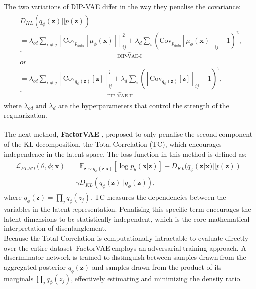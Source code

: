 The two variations of DIP-VAE differ in the way they penalise the covariance:
\begin{align}
\begin{split}
    & D_{KL}(q_{\phi}(\mathbf{z})||p(\mathbf{z})) = \\
    &\underbrace{ = \lambda_{od} \sum_{i\neq j} [\text{Cov}_{p_{data}}[\mu_{\phi}(\mathbf{x})]]^2_{ij} + \lambda_d \sum_i \left(\text{Cov}_{p_{data}}[\mu_{\phi}(\mathbf{x})]_{ij} - 1\right)^2}_{\text{DIP-VAE-I}}, \\
    & or \\
    &\underbrace{= \lambda_{od} \sum_{i\neq j} [\text{Cov}_{q_{\phi}(\mathbf{z})}[\mathbf{z}]]^2_{ij} + \lambda_d \sum_i \left([\text{Cov}_{q_{\phi}(\mathbf{z})}[\mathbf{z}]]_{ij} - 1\right)^2}_{\text{DIP-VAE-II}},
\end{split}
\end{align}
where $\lambda_{od}$ and $\lambda_d$ are the hyperparameters that control the strength of the regularization. \\
\\
The next method, \textbf{FactorVAE} \cite{kim2019disentanglingfactorising}, proposed to only penalise the second component of the KL decomposition, the Total Correlation (TC), which encourages independence in the 
latent space. The loss function in this method is defined as:
\begin{align}
\begin{split}
    \mathcal{L}_{ELBO}(\theta,\phi;\mathbf{x}) &= \mathbb{E}_{\mathbf{z}\sim q_{\phi}(\mathbf{z}|\mathbf{x})}\left[\log p_{\theta}(\mathbf{x}|\mathbf{z})\right] - D_{KL}(q_{\phi}(\mathbf{z}|\mathbf{x})||p(\mathbf{z})) \\
    &- \gamma D_{KL}(q_{\phi}(\mathbf{z})||\bar q_{\phi}(\mathbf{z})),
\end{split}
\end{align}
where $\bar q_{\phi}(\mathbf{z}) = \prod_j q_{\phi}(z_j)$. TC measures the dependencies between the variables in the latent representation. Penalising this specific term encourages the latent dimensions to be 
statistically independent, which is the core mathematical interpretation of disentanglement. \\
Because the Total Correlation is computationally intractable to evaluate directly over the entire dataset, FactorVAE employs an adversarial training approach. A discriminator network is trained to distinguish 
between samples drawn from the aggregated posterior $q_{\phi}(\mathbf{z})$ and samples drawn from the product of its marginals $\prod_j q_{\phi}(z_j)$, effectively estimating and minimizing the density ratio. 
